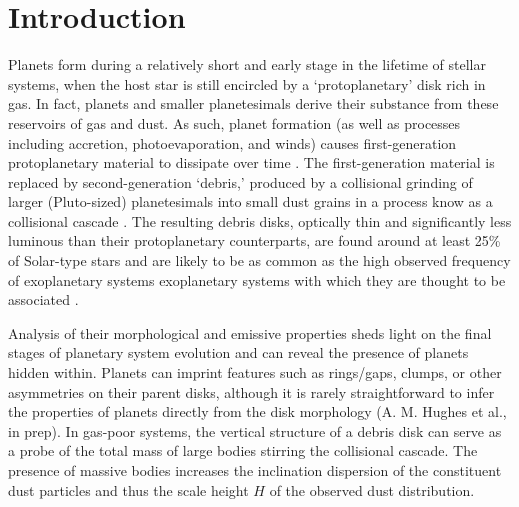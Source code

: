 \documentclass[12pt,oneside]{article}
\begin{document}
% 
% 
% 
% 

\section{Introduction}
\label{section: introduction}

Planets form during a relatively short and early stage in the lifetime of stellar systems,  when the host star is still encircled by a `protoplanetary' disk rich in gas. 
In fact, planets and smaller planetesimals derive their substance from these reservoirs of gas and dust.
As such, planet formation (as well as processes including accretion, photoevaporation, and winds) causes first-generation protoplanetary material to dissipate over time \citep{williams&cieza11,ercolano&pascucci17}.
The first-generation material is replaced by second-generation `debris,' produced by a collisional grinding of larger (Pluto-sized) planetesimals into small dust grains in a process know as a collisional cascade \citep{wyatt2008}. 
The resulting debris disks, optically thin and significantly less luminous than their protoplanetary counterparts, are found around at least 25\% of Solar-type stars and are likely to be as common as the high observed frequency of exoplanetary systems exoplanetary systems with which they are thought to be associated \citep{montesinos16}.

Analysis of their morphological and emissive properties sheds light on the final stages of planetary system evolution and can reveal the presence of planets hidden within.
Planets can imprint features such as rings/gaps, clumps, or other asymmetries on their parent disks, although it is rarely straightforward to infer the properties of planets directly from the disk morphology (A. M. Hughes et al., in prep).
In gas-poor systems, the vertical structure of a debris disk can serve as a probe of the total mass of large bodies stirring the collisional cascade.
The presence of massive bodies increases the inclination dispersion  of the constituent dust particles and thus the scale height $H$ of the observed dust distribution.
\end{document}
